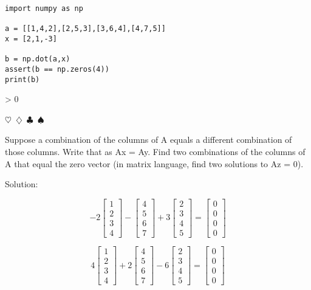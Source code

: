 \documentclass{article}
\newcommand{\sep}{\begin{center}$\heartsuit$~$\diamondsuit$~$\clubsuit$~$\spadesuit$\end{center}}
\newcommand{\sol}{\begin{center}\small{Solution:}\end{center}}
\newcounter{prblm}
\newcommand{\problem}[1]{
  \ifnum\value{prblm} > 0 \sep \fi
  \stepcounter{prblm}
  \noindent\textbf{\arabic{prblm}} #1
  \sol
}
\begin{document}
\begin{verbatim}
import numpy as np

a = [[1,4,2],[2,5,3],[3,6,4],[4,7,5]]
x = [2,1,-3]

b = np.dot(a,x)
assert(b == np.zeros(4))
print(b)
\end{verbatim}


\problem{Suppose a combination of the columns of A equals a different combination of those columns. Write that as Ax = Ay. Find two combinations of the columns of A that
equal the zero vector (in matrix language, find two solutions to Az = 0).}


\begin{displaymath}
-2 \begin{bmatrix} 1 \\ 2 \\ 3 \\ 4 \end{bmatrix}
- \begin{bmatrix} 4 \\ 5 \\ 6 \\ 7 \end{bmatrix}
+ 3 \begin{bmatrix} 2 \\ 3 \\ 4 \\ 5 \end{bmatrix}
= \begin{bmatrix} 0 \\ 0 \\ 0 \\ 0 \end{bmatrix}
\end{displaymath}

\begin{displaymath}
4 \begin{bmatrix} 1 \\ 2 \\ 3 \\ 4 \end{bmatrix}
+ 2 \begin{bmatrix} 4 \\ 5 \\ 6 \\ 7 \end{bmatrix}
- 6 \begin{bmatrix} 2 \\ 3 \\ 4 \\ 5 \end{bmatrix}
= \begin{bmatrix} 0 \\ 0 \\ 0 \\ 0 \end{bmatrix}
\end{displaymath}
\end{document}
